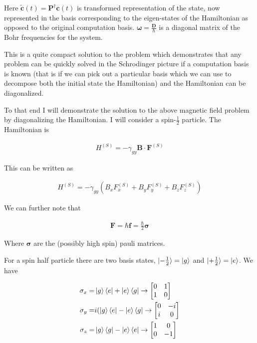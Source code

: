 \documentclass[12pt]{article}
\newcommand{\bv}[1]{\boldsymbol{#1}}
\begin{document}
Here $\tilde{\bv{c}}(t) = \bv{P}^{\dag}\bv{c}(t)$ is transformed representation of the state, now represented in the basis corresponding to the eigen-states of the Hamiltonian as opposed to the original computation basis.
$\bv{\omega} = \frac{\bv{D}}{\hbar}$ is a diagonal matrix of the Bohr frequencies for the system.

This is a quite compact solution to the problem which demonstrates that any problem can be quickly solved in the Schrodinger picture if a computation basis is known (that is if we can pick out a particular basis which we can use to decompose both the initial state the Hamiltonian) and the Hamiltonian can be diagonalized.

To that end I will demonstrate the solution to the above magnetic field problem by diagonalizing the Hamiltonian.
I will consider a spin-$\frac{1}{2}$ particle.
The Hamiltonian is

\begin{align}
H^{(S)} = -\gamma_{gy}\bv{B}\cdot\bv{F}^{(S)}
\end{align}

This can be written as

\begin{align}
H^{(S)} = -\gamma_{gy}\left(B_x F_x^{(S)} + B_y F_y^{(S)} + B_z F_z^{(S)}\right)
\end{align}

We can further note that

\begin{align}
\bv{F} = \hbar \bv{f} = \frac{\hbar}{2}\bv{\sigma}
\end{align}

Where $\bv{\sigma}$ are the (possibly high spin) pauli matrices.

For a spin half particle there are two basis states, $\ket{-\frac{1}{2}} = \ket{g}$ and $\ket{+\frac{1}{2}} = \ket{e}$.
We have

\begin{align}
\sigma_x =& \ket{g}\bra{e} + \ket{e}\bra{g} \rightarrow \begin{bmatrix}
0 & 1\\ 1 & 0
\end{bmatrix}\nonumber\\
\sigma_y =& i(\ket{g}\bra{e} - \ket{e}\bra{g} \rightarrow \begin{bmatrix}
0 & -i\\ i & 0
\end{bmatrix}\nonumber\\
\sigma_z =& \ket{g}\bra{g} - \ket{e}\bra{e} \rightarrow \begin{bmatrix}
1 & 0\\ 0 & -1
\end{bmatrix}
\end{align}
\end{document}
